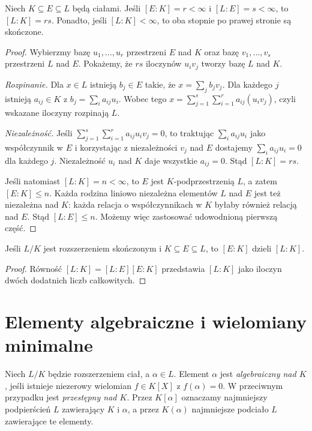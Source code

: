 \begin{twierdzenie}
\label{aa:tw:field-tower}
Niech $K\subseteq E\subseteq L$ będą ciałami.
Jeśli $[E:K]=r<\infty$ i $[L:E]=s<\infty$,
to $[L:K]=rs$. Ponadto, jeśli $[L:K]<\infty$,
to oba stopnie po prawej stronie są skończone.
\end{twierdzenie}
\begin{proof}
Wybierzmy bazę $u_1,\dots,u_r$ przestrzeni $E$ nad $K$
oraz bazę $v_1,\dots,v_s$ przestrzeni $L$ nad $E$.
Pokażemy, że $rs$ iloczynów $u_iv_j$ tworzy bazę $L$ nad $K$.

\emph{Rozpinanie.} Dla $x\in L$ istnieją $b_j\in E$ takie,
że $x=\sum_j b_jv_j$. Dla każdego $j$ istnieją $a_{ij}\in K$
z $b_j=\sum_i a_{ij}u_i$. Wobec tego
$x=\sum_{j=1}^s\sum_{i=1}^r a_{ij}(u_iv_j)$,
czyli wskazane iloczyny rozpinają $L$.

\emph{Niezależność.} Jeśli
$\sum_{j=1}^s\sum_{i=1}^r a_{ij}u_iv_j=0$,
to traktując $\sum_i a_{ij}u_i$ jako współczynnik w $E$
i korzystając z niezależności $v_j$ nad $E$ dostajemy
$\sum_i a_{ij}u_i=0$ dla każdego $j$.
Niezależność $u_i$ nad $K$ daje wszystkie $a_{ij}=0$.
Stąd $[L:K]=rs$.

Jeśli natomiast $[L:K]=n<\infty$, to $E$ jest
$K$-podprzestrzenią $L$, a zatem $[E:K]\le n$.
Każda rodzina liniowo niezależna elementów $L$ nad $E$
jest też niezależna nad $K$: każda relacja o współczynnikach
w $K$ byłaby również relacją nad $E$. Stąd $[L:E]\le n$.
Możemy więc zastosować udowodnioną pierwszą część.
\end{proof}

\begin{wniosek}
\label{aa:wn:tower-divisibility}
Jeśli $L/K$ jest rozszerzeniem skończonym i
$K\subseteq E\subseteq L$, to $[E:K]$ dzieli $[L:K]$.
\end{wniosek}
\begin{proof}
Równość $[L:K]=[L:E][E:K]$ przedstawia $[L:K]$
jako iloczyn dwóch dodatnich liczb całkowitych.
\end{proof}

\section{Elementy algebraiczne i wielomiany minimalne}
\begin{definicja}
\label{aa:def:algebraic-element}
Niech $L/K$ będzie rozszerzeniem ciał, a $\alpha\in L$.
Element $\alpha$ jest \emph{algebraiczny nad $K$}, jeśli
istnieje niezerowy wielomian $f\in K[X]$ z $f(\alpha)=0$.
W przeciwnym przypadku jest \emph{przestępny nad $K$}.
Przez $K[\alpha]$ oznaczamy najmniejszy podpierścień $L$
zawierający $K$ i $\alpha$, a przez $K(\alpha)$
najmniejsze podciało $L$ zawierające te elementy.
\end{definicja}

